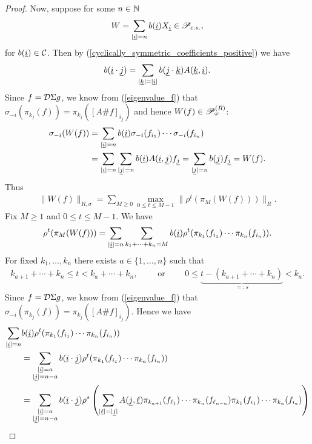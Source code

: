 \begin{proof}
Now, suppose for some $n\in\N$
	\begin{align*}
		W = \sum_{|\ul{i}|=n} b(\ul{i}) X_{\ul{i}} \in \P_{c.s.},
	\end{align*}
for $b(\ul{i})\in \C$. Then by (\ref{cyclically_symmetric_coefficients_positive}) we have
	\begin{align*}
		b(\ul{i}\cdot \ul{j}) = \sum_{|\ul{k}|=|\ul{i}|} b(\ul{j}\cdot \ul{k}) A(\ul{k},\ul{i}).
	\end{align*}
Since $f=\D\Sigma g$, we know from (\ref{eigenvalue_f}) that $\sigma_{-i}(\pi_{k_j}(f)) = \pi_{k_j}( [A\# f]_{i_j})$ and hence $W(f)\in \P_\varphi^{(R)}$:
	\begin{align*}
		\sigma_{-i}(W(f)) &= \sum_{|\ul{i}|=n} b(\ul{i}) \sigma_{-i}(f_{i_1})\cdots \sigma_{-i}(f_{i_n})\\
					&=\sum_{|\ul{i}|=n} \sum_{|\ul{j}|=n} b(\ul{i}) A(\ul{i},\ul{j}) f_{\ul{j}}= \sum_{|\ul{j}|=n} b(\ul{j}) f_{\ul{j}} = W(f).
	\end{align*}
Thus
	\begin{align*}
		\| W(f)\|_{R,\sigma} = \sum_{M\geq 0} \max_{0\leq t\leq M-1} \|\rho^t(\pi_M(W(f)))\|_R.
	\end{align*}
Fix $M\geq 1$ and $0\leq t\leq M-1$. We have
	\begin{align*}
		\rho^t(\pi_M(W(f))) = \sum_{|\ul{i}|=n} \sum_{k_1+\cdots + k_n = M} b(\ul{i})\rho^t( \pi_{k_1}(f_{i_1})\cdots \pi_{k_n}(f_{i_n})).
	\end{align*}
For fixed $k_1,\ldots, k_n$ there exists $a\in\{1,\ldots, n\}$ such that
	\begin{align*}
		k_{a+1}+\cdots +k_n \leq t < k_a+\cdots +k_n,\qquad	\text{ or }\qquad	0 \leq \underbrace{t- (k_{a+1}+\cdots+k_n)}_{=:s} < k_a.
	\end{align*}
Since $f=\D\Sigma g$, we know from (\ref{eigenvalue_f}) that $\sigma_{-i}(\pi_{k_j}(f)) = \pi_{k_j}( [A\# f]_{i_j})$. Hence we have
	\begin{align*}
		\sum_{|\ul{i}|=n} &b(\ul{i})\rho^t( \pi_{k_1}(f_{i_1})\cdots \pi_{k_n}(f_{i_n}))\\
		 &=\sum_{\substack{|\ul{i}|=a\\ |\ul{j}|=n-a}}b(\ul{i}\cdot \ul{j}) \rho^t( \pi_{k_1}(f_{i_1})\cdots \pi_{k_n}(f_{i_n})) \\
		 &= \sum_{\substack{|\ul{i}|=a\\ |\ul{j}|=n-a}} b(\ul{i}\cdot \ul{j}) \rho^s\left( \sum_{|\ul{\ell}|=|\ul{j}|} A(\ul{j},\ul{\ell}) \pi_{k_{a+1}}(f_{\ell_1})\cdots \pi_{k_n}(f_{\ell_{n-a}}) \pi_{k_1}(f_{i_1})\cdots \pi_{k_a}(f_{i_a})\right) \\

\end{align*}
\end{proof}
